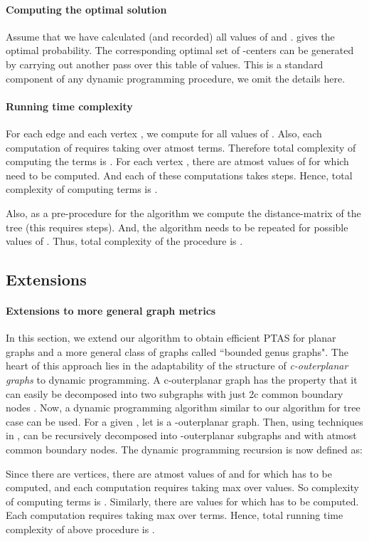 \documentclass[11pt,onecolumn]{article}
\begin{document}
\paragraph{Computing the optimal solution}
Assume that we have calculated (and recorded) all values of  and .  gives the optimal probability. The corresponding optimal set of -centers can be generated by carrying out another pass over this table of values. This is a standard component of any dynamic programming procedure, we omit the details here. 

\paragraph{Running time complexity} For each edge  and each vertex , we compute  for all  values of . 
Also, each computation of  requires taking  over atmost  terms. Therefore total complexity of computing
the terms  is .
For each vertex , there are atmost  values of  for which  need to be computed. 
And each of these computations takes  steps. Hence, total complexity of computing terms  is . 

Also, as a pre-procedure for the algorithm we compute the distance-matrix of the tree (this requires  steps). And, the algorithm needs to be repeated for  possible values of . Thus, total complexity of the procedure is .

\subsection{Extensions} 
\paragraph{Extensions to more general graph metrics}
In this section, we extend our algorithm to obtain efficient PTAS
for planar graphs and a more general class of graphs called ``bounded genus graphs". The heart of this approach lies in the adaptability of the structure of {\it c-outerplanar graphs} to dynamic programming. A c-outerplanar graph has the property that it can easily be decomposed into two subgraphs with just 2c common boundary nodes \cite{baker94}. 
Now, a dynamic programming algorithm similar to our algorithm for tree case can be used. For a given , let  is a -outerplanar graph. Then, using techniques in \cite{baker94},  can be recursively decomposed into -outerplanar subgraphs  and  with atmost  common boundary nodes. The dynamic programming recursion is now defined as:


Since there are  vertices, there are atmost  values of  and  for which  has to be computed, and each computation requires taking max over  values. So complexity of computing terms  is . Similarly, there are  values for which  has to be computed. Each computation requires taking max over  terms. Hence, total running time complexity of above procedure is . 
\end{document}

